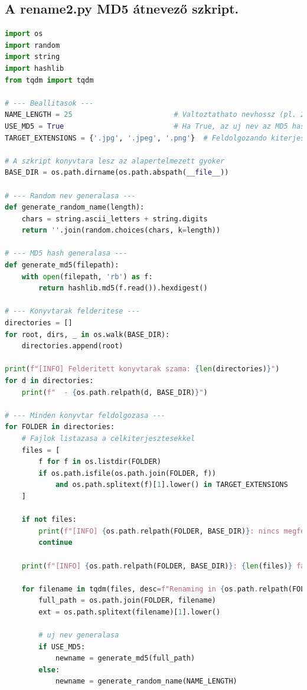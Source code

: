 \documentclass[	
  noindent
]{elteikthesis}[2024/04/26]
\begin{document}
  \subsection{A rename2.py MD5 átnevező szkript.}
    \begin{lstlisting}[language={Python}]
import os
import random
import string
import hashlib
from tqdm import tqdm

# --- Beallitasok ---
NAME_LENGTH = 25                        # Valtoztathato nevhossz (pl. 20-25)
USE_MD5 = True                          # Ha True, az uj nev az MD5 hash lesz
TARGET_EXTENSIONS = {'.jpg', '.jpeg', '.png'}  # Feldolgozando kiterjesztesek

# A szkript konyvtara lesz az alapertelmezett gyoker
BASE_DIR = os.path.dirname(os.path.abspath(__file__))

# --- Random nev generalasa ---
def generate_random_name(length):
    chars = string.ascii_letters + string.digits
    return ''.join(random.choices(chars, k=length))

# --- MD5 hash generalasa ---
def generate_md5(filepath):
    with open(filepath, 'rb') as f:
        return hashlib.md5(f.read()).hexdigest()

# --- Konyvtarak felderitese ---
directories = []
for root, dirs, _ in os.walk(BASE_DIR):
    directories.append(root)

print(f"[INFO] Felderitett konyvtarak szama: {len(directories)}")
for d in directories:
    print(f"  - {os.path.relpath(d, BASE_DIR)}")

# --- Minden konyvtar feldolgozasa ---
for FOLDER in directories:
    # Fajlok listazasa a celkiterjesztesekkel
    files = [
        f for f in os.listdir(FOLDER)
        if os.path.isfile(os.path.join(FOLDER, f))
            and os.path.splitext(f)[1].lower() in TARGET_EXTENSIONS
    ]

    if not files:
        print(f"[INFO] {os.path.relpath(FOLDER, BASE_DIR)}: nincs megfelelo fajl.")
        continue

    print(f"[INFO] {os.path.relpath(FOLDER, BASE_DIR)}: {len(files)} fajl atnevezese...")

    for filename in tqdm(files, desc=f"Renaming in {os.path.relpath(FOLDER, BASE_DIR)}"):
        full_path = os.path.join(FOLDER, filename)
        ext = os.path.splitext(filename)[1].lower()

        # uj nev generalasa
        if USE_MD5:
            newname = generate_md5(full_path)
        else:
            newname = generate_random_name(NAME_LENGTH)


\end{lstlisting}
\end{document}
